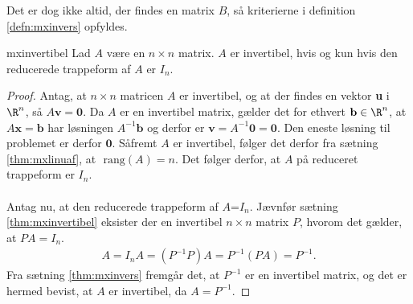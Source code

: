 %
%
Det er dog ikke altid, der findes en matrix $B$, så kriterierne i definition \ref{defn:mxinvers} opfyldes. 
%
\begin{thm}{}{mxinvertibel}
Lad $A$ være en $n \times n$ matrix. 
$A$ er invertibel, hvis og kun hvis den reducerede trappeform af $A$ er $I_n$.
\end{thm}
%
\begin{proof}
Antag, at $n\times n$ matricen $A$ er invertibel, og at der findes en vektor \textbf{u} i $\R^n$, så $A\textbf{v}=\textbf{0}$. 
Da $A$ er en invertibel matrix, gælder det for ethvert $\mathbf{b} \in \R^n$, at $A\textbf{x}=\mathbf{b}$ har løsningen $A^{-1}\mathbf{b}$ og derfor er $\textbf{v}=A^{-1}\textbf{0}=\textbf{0}$. 
Den eneste løsning til problemet er derfor $\textbf{0}$. 
Såfremt $A$ er invertibel, følger det derfor fra sætning \ref{thm:mxlinuaf}, at $\text{ rang}(A)=n$.
Det følger derfor, at $A$ på reduceret trappeform er $I_n$.
\\\\
Antag nu, at den reducerede trappeform af $A$=$I_n$. 
Jævnfør sætning \ref{thm:mxinvertibel} eksister der en invertibel $n \times n$ matrix $P$, hvorom det gælder, at $PA=I_n$. 
%
\begin{align*}
A=I_nA=(P^{-1}P)A=P^{-1}(PA)=P^{-1}.
\end{align*}
%
Fra sætning \ref{thm:mxinvers} fremgår det, at $P^{-1}$ er en invertibel matrix, og det er hermed bevist, at $A$ er invertibel, da $A=P^{-1}$.
\end{proof}
\\
